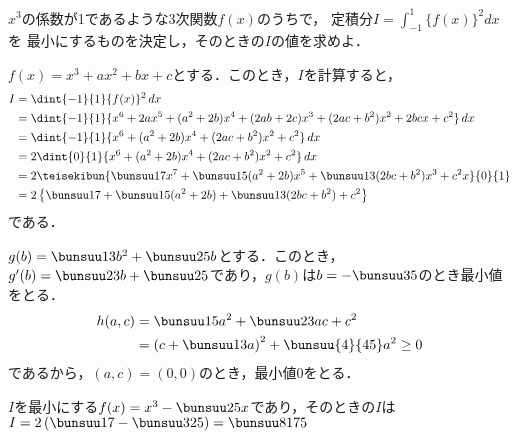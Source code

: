 \begin{problem}
$x^3$の係数が1であるような3次関数$f(x)$のうちで，
定積分$\displaystyle I=\int_{-1}^1 {\{ f(x) \}}^2dx$を
最小にするものを決定し，そのときの$I$の値を求めよ．
\end{problem}

$f(x) = x^3 + ax^2 + bx + c$とする．このとき，$I$を計算すると，
\begin{align*}
  I &= \dint{-1}{1}\{f(x)\}^2\,dx\\
  &= \dint{-1}{1}\{x^6 + 2ax^5 + (a^2 + 2b)x^4 + (2ab + 2c)x^3 + (2ac + b^2)x^2 + 2bcx + c^2\}\,dx\\
  &= \dint{-1}{1}\{x^6 + (a^2 + 2b)x^4 + (2ac + b^2)x^2 + c^2\}\,dx\\
  &= 2\dint{0}{1}\{x^6 + (a^2 + 2b)x^4 + (2ac + b^2)x^2 + c^2\}\,dx\\
  &= 2\teisekibun{\bunsuu17x^7 + \bunsuu15(a^2+2b)x^5 + \bunsuu13(2bc + b^2)x^3 + c^2x}{0}{1}\\
  &= 2\left\{\bunsuu17 + \bunsuu15(a^2+2b) + \bunsuu13(2bc + b^2) + c^2\right\}
\end{align*}
である．

$g(b) = \bunsuu13b^2 + \bunsuu25b$とする．このとき，$g'(b) = \bunsuu23b + \bunsuu25$であり，$g(b)$は$b = -\bunsuu35$のとき最小値をとる．
\begin{align*}
  h(a,c) &= \bunsuu15a^2 + \bunsuu23ac + c^2 \\
  &= \left(c + \bunsuu13a\right)^2 + \bunsuu{4}{45}a^2 \geq 0
\end{align*}
であるから，$(a,c) = (0, 0)$のとき，最小値$0$をとる．

$I$を最小にする$f(x) = x^3-\bunsuu25x$であり，そのときの$I$は
$I = 2\left(\bunsuu17 - \bunsuu3{25}\right) = \bunsuu8{175}$

